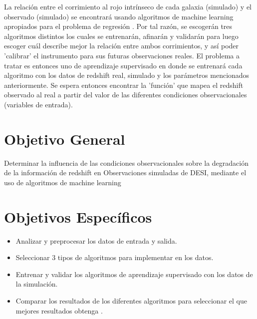\documentclass[12pt]{article}
\begin{document}
La relación entre el corrimiento al rojo intr\'inseco de cada galaxia
(simulado) y el observado (simulado) se encontrará usando algoritmos de machine
learning apropiados para el problema de regresión
\cite{bishop2006pattern}. Por tal razón, se escogerán tres algoritmos
distintos los cuales se entrenarán, afinarán y validarán para luego
escoger cuál describe mejor la relación entre ambos corrimientos, y
así poder 'calibrar' el instrumento para sus futuras observaciones
reales. El problema a tratar es entonces uno de aprendizaje
supervisado en donde se entrenará cada algoritmo con los datos de
redshift real, simulado y los parámetros mencionados anteriormente. Se
espera entonces encontrar la 'función' que mapea el redshift observado
al real a partir del valor de las diferentes condiciones
observacionales (variables de entrada).  







\section{Objetivo General}


Determinar la influencia de las condiciones observacionales sobre la
degradación de la información de redshift en Observaciones simuladas
de DESI, mediante el uso de algoritmos de machine learning 
 
\section{Objetivos Específicos}


\begin{itemize}
	\item Analizar y preprocesar los datos de entrada y salida.
	\item Seleccionar 3 tipos de algoritmos para implementar en los datos.
	\item Entrenar y validar los algoritmos de aprendizaje
          supervisado con los datos de la simulación.
	\item Comparar los resultados de los diferentes algoritmos
          para seleccionar el que mejores resultados obtenga .
\end{itemize}
\end{document}
